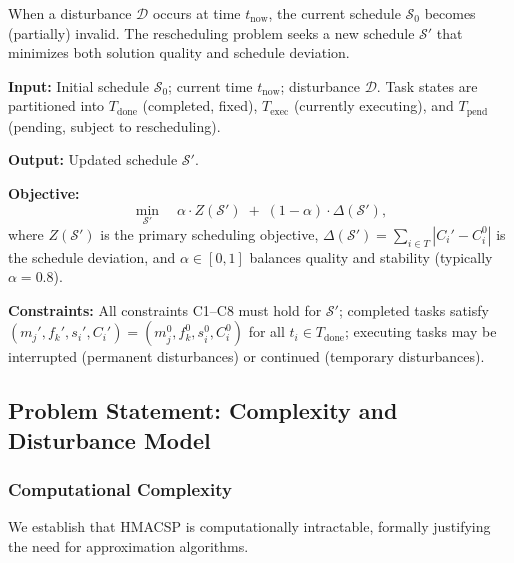 \documentclass[manuscript,screen,review]{acmart}
\begin{document}
\begin{definition}
\label{def:dynamic}
When a disturbance $\mathcal{D}$ occurs at time $t_{\mathrm{now}}$, the
current schedule $\mathcal{S}_0$ becomes (partially) invalid.
The rescheduling problem seeks a new schedule $\mathcal{S}'$ that
minimizes both solution quality and schedule deviation.

\textbf{Input:} Initial schedule $\mathcal{S}_0$; current time
$t_{\mathrm{now}}$; disturbance $\mathcal{D}$. Task states are
partitioned into $T_{\mathrm{done}}$ (completed, fixed),
$T_{\mathrm{exec}}$ (currently executing), and
$T_{\mathrm{pend}}$ (pending, subject to rescheduling).

\textbf{Output:} Updated schedule $\mathcal{S}'$.

\textbf{Objective:}
\begin{equation}
    \min_{\mathcal{S}'} \quad
    \alpha \cdot Z(\mathcal{S}') \;+\; (1-\alpha) \cdot \Delta(\mathcal{S}'),
    \label{eq:dynamic_obj}
\end{equation}
where $Z(\mathcal{S}')$ is the primary scheduling objective,
$\Delta(\mathcal{S}') = \sum_{i \in T} |C_i' - C_i^0|$ is the schedule
deviation, and $\alpha \in [0,1]$ balances quality and stability
(typically $\alpha = 0.8$).

\textbf{Constraints:} All constraints C1--C8 must hold for $\mathcal{S}'$;
completed tasks satisfy
$(m_j', f_k', s_i', C_i') = (m_j^0, f_k^0, s_i^0, C_i^0)$
for all $t_i \in T_{\mathrm{done}}$; executing tasks may be interrupted
(permanent disturbances) or continued (temporary disturbances).
\end{definition}
\subsection{Problem Statement: Complexity and Disturbance Model}
\label{subsec:problem_statement}

\subsubsection{Computational Complexity}

We establish that HMACSP is computationally intractable, formally justifying the
need for approximation algorithms.
\end{document}
